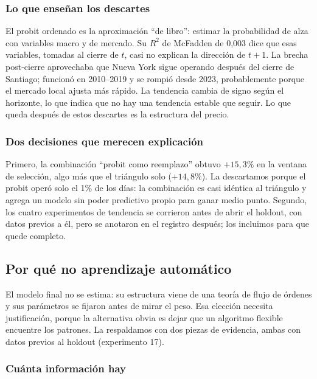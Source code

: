\documentclass[10pt,a4paper]{article}
\begin{document}
\subsubsection{Lo que enseñan los descartes}

El probit ordenado es la aproximación ``de libro'': estimar la probabilidad de alza con
variables macro y de mercado. Su $R^2$ de McFadden de 0,003 dice que esas variables,
tomadas al cierre de $t$, casi no explican la dirección de $t+1$. La brecha post-cierre
aprovechaba que Nueva York sigue operando después del cierre de Santiago; funcionó en
2010--2019 y se rompió desde 2023, probablemente porque el mercado local ajusta más
rápido. La tendencia cambia de signo según el horizonte, lo que indica que no hay una
tendencia estable que seguir. Lo que queda después de estos descartes es la estructura
del precio.

\subsubsection{Dos decisiones que merecen explicación}

Primero, la combinación ``probit como reemplazo'' obtuvo $+15{,}3\%$ en la ventana de
selección, algo más que el triángulo solo ($+14{,}8\%$). La descartamos porque el
probit operó solo el 1\% de los días: la combinación es casi idéntica al triángulo y
agrega un modelo sin poder predictivo propio para ganar medio punto. Segundo, los cuatro
experimentos de tendencia se corrieron antes de abrir el holdout, con datos previos a
él, pero se anotaron en el registro después; los incluimos para que quede completo.

\subsection{Por qué no aprendizaje automático}\label{sec:noml}

El modelo final no se estima: su estructura viene de una teoría de flujo de órdenes y
sus parámetros se fijaron antes de mirar el peso. Esa elección necesita justificación,
porque la alternativa obvia es dejar que un algoritmo flexible encuentre los patrones.
La respaldamos con dos piezas de evidencia, ambas con datos previos al holdout
(experimento 17).

\subsubsection{Cuánta información hay}
\end{document}
